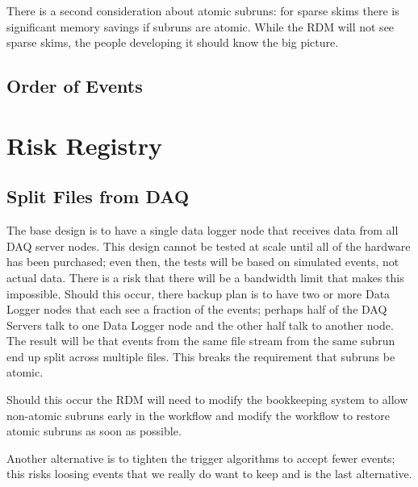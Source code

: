 There is a second consideration about atomic subruns:
for sparse skims there is significant memory savings if subruns are atomic.
While the RDM will not see sparse skims, the people developing it should know the big picture.


\section{Order of Events}

\chapter{Risk Registry}
\label{app:RisKRegistry}

\section{Split Files from DAQ}
\label{app:Risk:SplitFiles}

The base design is to have a single data logger node that receives data from all DAQ server nodes.
This design cannot be tested at scale until all of the hardware has been purchased;
even then, the tests will be based on simulated events, not actual data.
There is a risk that there will be a bandwidth limit that makes this impossible.
Should this occur, there backup plan is to have two or more Data Logger nodes
that each see a fraction of the events;
perhaps half of the DAQ Servers talk to one Data Logger node and the other half talk to another node.
The result will be that events from the same file stream from the same subrun end up split across multiple files.
This breaks the requirement that subruns be atomic.

Should this occur the RDM will need to modify the bookkeeping system to allow non-atomic subruns early
in the workflow and modify the workflow to restore atomic subruns as soon as possible.

Another alternative is to tighten the trigger algorithms to accept fewer events;
this risks loosing events that we really do want to keep and is the last alternative.

\clearpage
{}
{}
\printbibliography


